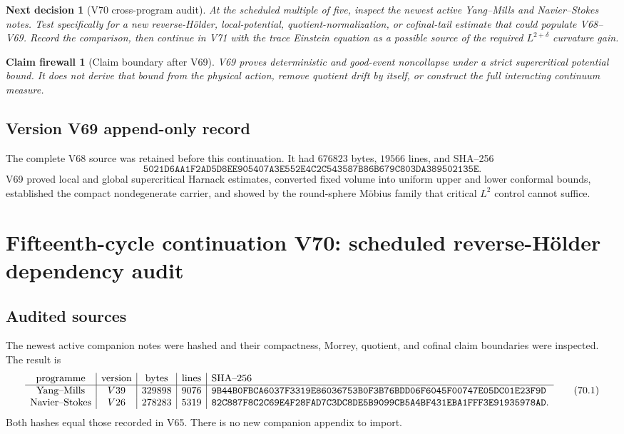 \documentclass[11pt]{article}
\newtheorem{firewall}[theorem]{Claim firewall}
\newtheorem{decision}[theorem]{Next decision}
\theoremstyle{remark}
\begin{document}
\begin{decision}[V70 cross-program audit]
\label{dec:v15v69-next}
At the scheduled multiple of five, inspect the newest active
Yang--Mills and Navier--Stokes notes.  Test specifically for a new
reverse-H\"older, local-potential, quotient-normalization, or
cofinal-tail estimate that could populate V68--V69.  Record the
comparison, then continue in V71 with the trace Einstein equation
as a possible source of the required \(L^{2+\delta}\) curvature
gain.
\end{decision}

\begin{firewall}[Claim boundary after V69]
\label{fire:v15v69}
V69 proves deterministic and good-event noncollapse under a strict
supercritical potential bound.  It does not derive that bound from
the physical action, remove quotient drift by itself, or construct
the full interacting continuum measure.
\end{firewall}

\section*{Version V69 append-only record}
The complete V68 source was retained before this continuation.  It
had \(676823\) bytes, \(19566\) lines, and SHA--256
\[
 \texttt{5021D6AA1F2AD5D8EE905407A3E552E4C2C543587B86B679C803DA389502135E}.
\]
V69 proved local and global supercritical Harnack estimates,
converted fixed volume into uniform upper and lower conformal
bounds, established the compact nondegenerate carrier, and showed
by the round-sphere M\"obius family that critical \(L^2\) control
cannot suffice.

\chapter{Fifteenth-cycle continuation V70: scheduled reverse-H\"older dependency audit}
\label{sec:v15v70}

\section{Audited sources}

The newest active companion notes were hashed and their compactness,
Morrey, quotient, and cofinal claim boundaries were inspected.  The
result is
\[
\begin{array}{c|c|c|c|l}
\hbox{programme}&\hbox{version}&\hbox{bytes}&\hbox{lines}&\hbox{SHA--256}\\ \hline
\hbox{Yang--Mills}&V39&329898&9076&
\texttt{9B44B0FBCA6037F3319E86036753B0F3B76BDD06F6045F00747E05DC01E23F9D}\\
\hbox{Navier--Stokes}&V26&278283&5319&
\texttt{82C887F8C2C69E4F28FAD7C3DC8DE5B9099CB5A4BF431EBA1FFF3E91935978AD}.
\end{array}                                             \tag{70.1}
\]
Both hashes equal those recorded in V65.  There is no new companion
appendix to import.
\end{document}
